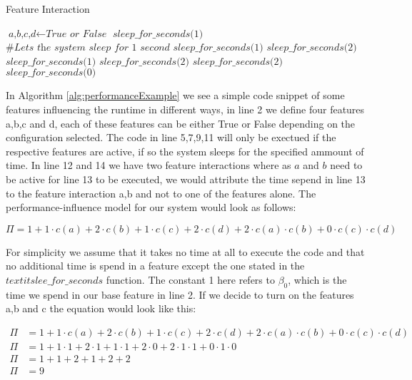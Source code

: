 \makeatletter
\def\BState{\State\hskip-\ALG@thistlm}
\makeatother

\begin{algorithm}
\caption{Feature Interaction \label{alg:performanceExample}}
\begin{algorithmic}[1]
\State $\textit{a,b,c,d} \gets \textit{True or False}$
\State $\textit{sleep\_for\_seconds(1)}$ $\textit{\#Lets the system sleep for 1 second}$
    \State $\textit{sleep\_for\_seconds(1)}$
\EndIf
{} 
    \State $\textit{sleep\_for\_seconds(2)}$
\EndIf
{} 
    \State $\textit{sleep\_for\_seconds(1)}$
\EndIf
{} 
    \State $\textit{sleep\_for\_seconds(2)}$
\EndIf
{} 
    \State $\textit{sleep\_for\_seconds(2)}$
\EndIf
{} 
    \State $\textit{sleep\_for\_seconds(0)}$
\EndIf

\EndProcedure
\end{algorithmic}
\end{algorithm}


In Algorithm \ref{alg:performanceExample} we see a simple code snippet of some features influencing the runtime in different ways, in line 
2 we define four features a,b,c and d, each of these features can be either True or False depending on the configuration selected. The code in
line 5,7,9,11 will only be exectued if the respective features are active, if so the system sleeps for the specified ammount of time. In line
12 and 14 we have two feature interactions where as $a$ and $b$ need to be active for line 13 to be executed, we would attribute the time sepend
in line 13 to the feature interaction a,b and not to one of the features alone.
The performance-influence model for our system would look as follows:

\begin{equation*}
    \Pi = 1 + 1 \cdot c(a) + 2\cdot c(b) + 1\cdot c(c) + 2\cdot c(d) + 2 \cdot c(a)\cdot c(b) + 0\cdot c(c) \cdot c(d)
\end{equation*}

For simplicity we assume that it takes no time at all to execute the code and that no additional time is spend in a feature except the one
stated in the $textit{slee\_for\_seconds}$ function. The constant 1 here refers to $\beta_0$, which is the time we spend in our base feature
in line 2. If we decide to turn on the features a,b and c the equation would look like this:

\begin{align*}
    \Pi &= 1 + 1 \cdot c(a) + 2\cdot c(b) + 1\cdot c(c) + 2\cdot c(d) + 2 \cdot c(a)\cdot c(b) + 0\cdot c(c) \cdot c(d) \\
    \Pi &= 1 + 1 \cdot 1 + 2 \cdot 1 + 1 \cdot 1 + 2 \cdot 0 + 2 \cdot 1 \cdot 1 + 0 \cdot 1 \cdot 0 \\
    \Pi &= 1 + 1 + 2 + 1 + 2 + 2 \\
    \Pi &= 9
\end{align*}

